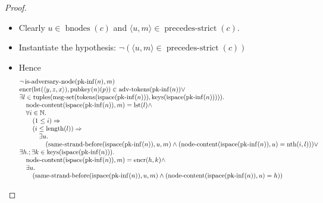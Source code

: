 \documentclass[11pt]{article}
\theoremstyle{plain}
\begin{document}
\begin{proof}
\begin{itemize}[leftmargin=2.8em, itemsep=4pt, parsep=1pt]
\begin{itemize}[leftmargin=2.8em, itemsep=4pt, parsep=1pt]
  \item[\textbf{196--197}] Clearly $u \in \operatorname{bnodes}(c)$ and $\langle u, m \rangle \in \operatorname{precedes\text{-}strict}(c)$.
  \item[\textbf{198}] Instantiate the hypothesis: $\neg (\langle u, m \rangle \in \operatorname{precedes\text{-}strict}(c))$
  \item[\textbf{199--202}] Hence 
\begin{equation*}
\begin{array}{@{}l@{}}
\neg \operatorname{is\text{-}adversary\text{-}node}(\operatorname{pk\text{-}inf}(n), m) \\
\begin{array}{@{}l@{}} \operatorname{encr}(\operatorname{lst}(\langle y, z, x \rangle), \operatorname{pubkey}(n)(p)) \in \operatorname{adv\text{-}tokens}(\operatorname{pk\text{-}inf}(n)) \vee \\ \exists l \in \operatorname{tuples}(\operatorname{msg\text{-}set}(\operatorname{tokens}(\operatorname{ispace}(\operatorname{pk\text{-}inf}(n))), \operatorname{keys}(\operatorname{ispace}(\operatorname{pk\text{-}inf}(n))))). \\ \quad \operatorname{node\text{-}content}(\operatorname{ispace}(\operatorname{pk\text{-}inf}(n)), m) = \operatorname{lst}(l) \wedge \\ \quad \forall i \in \mathbb{N}. \\ \quad \quad (1 \leq i) \Rightarrow  \\ \quad \quad (i \leq \operatorname{length}(l)) \Rightarrow  \\ \quad \quad \quad \exists u. \\ \quad \quad \quad \quad (\operatorname{same\text{-}strand\text{-}before}(\operatorname{ispace}(\operatorname{pk\text{-}inf}(n)), u, m) \wedge (\operatorname{node\text{-}content}(\operatorname{ispace}(\operatorname{pk\text{-}inf}(n)), u) = \operatorname{nth}(i, l))) \vee \\ \exists h.; \exists k \in \operatorname{keys}(\operatorname{ispace}(\operatorname{pk\text{-}inf}(n))). \\ \quad \operatorname{node\text{-}content}(\operatorname{ispace}(\operatorname{pk\text{-}inf}(n)), m) = \operatorname{encr}(h, k) \wedge \\ \quad \exists u. \\ \quad \quad (\operatorname{same\text{-}strand\text{-}before}(\operatorname{ispace}(\operatorname{pk\text{-}inf}(n)), u, m) \wedge (\operatorname{node\text{-}content}(\operatorname{ispace}(\operatorname{pk\text{-}inf}(n)), u) = h)) \end{array} \\

\end{array}
\end{equation*}
\end{itemize}
\end{itemize}
\end{proof}
\end{document}
